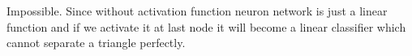 \begin{answer}
Impossible. Since without activation function neuron network is just a linear function and if we activate it at last node it will become a linear classifier which cannot separate a triangle perfectly.
    
\end{answer}
